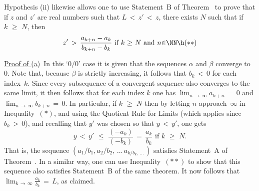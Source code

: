         Hypothesis (ii) likewise allows one to use Statement~B of Theorem~ to prove that
    if $z$ and $z'$ are real numbers such that $L\,<\,z'\,<\,z$, there exists $N$ such that if $k\,\,{\geq}\,\,N$, then
        \begin{displaymath}
        z' \,>\,\frac{a_{k+n}-a_{k}}{b_{k+n}-b_{k}} \mbox{ if $k\,\,{\geq}\,\,N$ and $n{\in}{\NN}$} \h ({\ast}{\ast})
        \end{displaymath}

\V

        \underline{Proof of (a)}\, In this `$0/0$' case it is given that the sequences ${\alpha}$ and ${\beta}$ converge to~$0$.
    Note that, because ${\beta}$ is strictly increasing, it follows that $b_{k}\,<\,0$ for each index~$k$.
    Since every subsequence of a convergent sequence also converges to the same limit, it then follows that for each index $k$ one has
    $\lim_{n \,{\rightarrow}\, {\infty}} a_{k+n} \,=\, 0$ and $\lim_{n \,{\rightarrow}\, {\infty}} b_{k+n} \,=\, 0$.
    In particular, if $k\,\,{\geq}\,\,N$ then by letting $n$ approach~${\infty}$ in Inequality~$({\ast})$, and using the Quotient Rule for Limits (which applies since $b_{k}\,>\,0$),
    and recalling that $y'$ was chosen so that $y\,<\,y'$, one gets
        \begin{displaymath}
        y\,<\,y'\,\,{\leq}\,\,\frac{(-a_{k})}{(-b_{k})}
         \,=\, \frac{a_{k}}{b_{k}} \mbox{ if $k\,\,{\geq}\,\,N$}.
        \end{displaymath}
    That is, the sequence $(a_{1}/b_{1}, a_{2}/b_{2},\,{\ldots}\,a_{k/b_{k},\,{\ldots}\,})$ satisfies Statement~A of Theorem~.
    In a similar way, one can use Inequality~$({\ast}{\ast})$ to show that this sequence also satisfies Statement~B of the same theorem.
    It now follows that ${\displaystyle \lim_{k \,{\rightarrow}\, {\infty}} \frac{a_{k}}{b_{k}} \,=\, L}$, as claimed.

\V%

